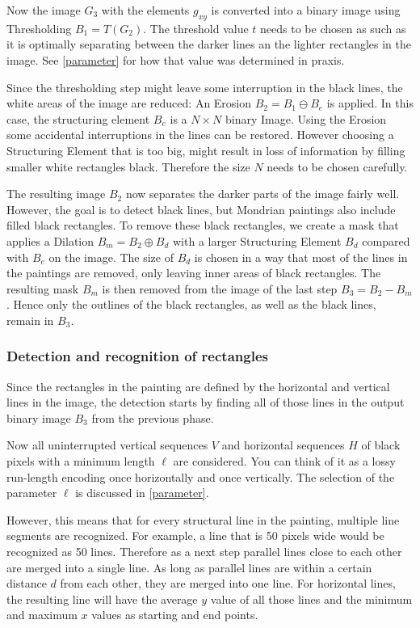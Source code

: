 \documentclass[serif,article,noparskip]{agse-thesis}
\begin{document}
Now the image $G_3$ with the elements $g_{xy}$ is converted into a binary image
using Thresholding $B_1 = T(G_2)$. The threshold value $t$ needs to be chosen as
such as it is optimally separating between the darker lines an the lighter
rectangles in the image. See \ref{parameter} for how that value was determined
in praxis.

Since the thresholding step might leave some interruption in the black lines,
the white areas of the image are reduced: An Erosion $B_2 = B_1 \ominus B_e$ is
applied. In this case, the structuring element $B_e$ is a $N\times N$ binary
Image. Using the Erosion some accidental interruptions in the lines can be
restored. However choosing a Structuring Element that is too big, might result
in loss of information by filling smaller white rectangles black. Therefore the
size $N$ needs to be chosen carefully.

The resulting image $B_2$ now separates the darker parts of the image fairly
well. However, the goal is to detect black lines, but Mondrian paintings also
include filled black rectangles. To remove these black rectangles, we create a
mask that applies a Dilation $B_m = B_2 \oplus B_d$ with a larger Structuring
Element $B_d$ compared with $B_e$ on the image. The size of $B_d$ is chosen in a
way that most of the lines in the paintings are removed, only leaving inner
areas of black rectangles. The resulting mask $B_m$ is then removed from the
image of the last step $B_3 = B_2 - B_m$. Hence only the outlines of the black
rectangles, as well as the black lines, remain in $B_3$.

\subsubsection{Detection and recognition of rectangles} \label{rectangles}

Since the rectangles in the painting are defined by the horizontal and
vertical lines in the image, the detection starts by finding all of those lines
in the output binary image $B_3$ from the previous phase.

Now all uninterrupted vertical sequences $V$ and horizontal sequences $H$ of
black pixels with a minimum length $\ell$ are considered. You can think of it as
a lossy run-length encoding once horizontally and once vertically. The selection
of the parameter $\ell$ is discussed in \ref{parameter}.

However, this means that for every structural line in the painting, multiple
line segments are recognized. For example, a line that is 50 pixels wide would
be recognized as 50 lines. Therefore as a next step parallel lines close to each
other are merged into a single line. As long as parallel lines are within a
certain distance $d$ from each other, they are merged into one line. For
horizontal lines, the resulting line will have the average $y$ value of all
those lines and the minimum and maximum $x$ values as starting and end points.
\end{document}
